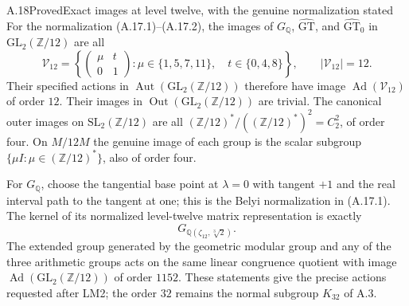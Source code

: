 \begin{statement}{A.18}{Proved}{Exact images at level twelve, with the genuine normalization stated}
For the normalization (A.17.1)--(A.17.2), the images of
$G_{\mathbb Q}$, $\widehat{\mathrm{GT}}$, and
$\widehat{\mathrm{GT}}_0$ in $\mathrm{GL}_2(\mathbb Z/12)$ are all
\[
 \mathcal V_{12}=
 \left\{\begin{pmatrix}\mu&t\\0&1\end{pmatrix}:
     \mu\in\{1,5,7,11\},\quad t\in\{0,4,8\}\right\},
 \qquad |\mathcal V_{12}|=12.                      \tag{A.18.1}
\]
Their specified actions in $\operatorname{Aut}(\mathrm{GL}_2(\mathbb Z/12))$
therefore have image $\operatorname{Ad}(\mathcal V_{12})$ of order
$12$. Their images in
$\operatorname{Out}(\mathrm{GL}_2(\mathbb Z/12))$ are trivial.
The canonical outer images on $\mathrm{SL}_2(\mathbb Z/12)$ are all
$(\mathbb Z/12)^*/((\mathbb Z/12)^*)^2=C_2^2$, of order four.
On $M/12M$ the genuine image of each group is the scalar subgroup
$\{\mu I:\mu\in(\mathbb Z/12)^*\}$, also of order four.

For $G_{\mathbb Q}$, choose the tangential base point at $\lambda=0$
with tangent $+1$ and the real interval path to the tangent at one;
this is the Belyi normalization in (A.17.1).
The kernel of its normalized level-twelve matrix representation is
exactly
\[
 G_{\mathbb Q(\zeta_{12},\sqrt[3]{2})}.           \tag{A.18.2}
\]
The extended group generated by the geometric modular group and
any of the three arithmetic groups acts on the same linear
congruence quotient with image
$\operatorname{Ad}(\mathrm{GL}_2(\mathbb Z/12))$ of order $1152$.
These statements give the precise actions requested after LM2;
the order $32$ remains the normal subgroup $K_{32}$ of A.3.
\end{statement}
